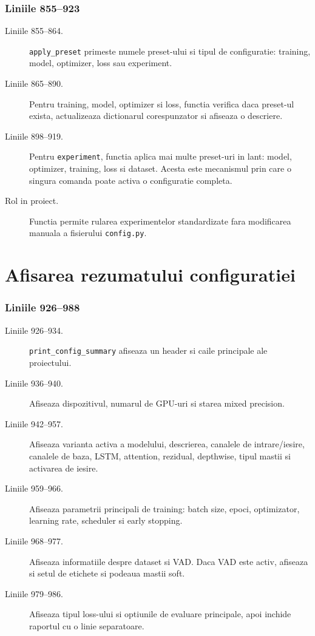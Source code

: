 \documentclass[12pt,a4paper]{report}
\newcommand{\codechunk}[2]{%
\subsection*{Liniile #1--#2}

}
\begin{document}
\codechunk{855}{923}

\begin{description}
    \item[Liniile 855--864.] \texttt{apply\_preset} primeste numele preset-ului si
    tipul de configuratie: training, model, optimizer, loss sau experiment.

    \item[Liniile 865--890.] Pentru training, model, optimizer si loss, functia
    verifica daca preset-ul exista, actualizeaza dictionarul corespunzator si
    afiseaza o descriere.

    \item[Liniile 898--919.] Pentru \texttt{experiment}, functia aplica mai multe
    preset-uri in lant: model, optimizer, training, loss si dataset. Acesta este
    mecanismul prin care o singura comanda poate activa o configuratie completa.

    \item[Rol in proiect.] Functia permite rularea experimentelor standardizate
    fara modificarea manuala a fisierului \texttt{config.py}.
\end{description}

\chapter{Afisarea rezumatului configuratiei}

\codechunk{926}{988}

\begin{description}
    \item[Liniile 926--934.] \texttt{print\_config\_summary} afiseaza un header si
    caile principale ale proiectului.

    \item[Liniile 936--940.] Afiseaza dispozitivul, numarul de GPU-uri si starea
    mixed precision.

    \item[Liniile 942--957.] Afiseaza varianta activa a modelului, descrierea,
    canalele de intrare/iesire, canalele de baza, LSTM, attention, rezidual,
    depthwise, tipul mastii si activarea de iesire.

    \item[Liniile 959--966.] Afiseaza parametrii principali de training: batch size,
    epoci, optimizator, learning rate, scheduler si early stopping.

    \item[Liniile 968--977.] Afiseaza informatiile despre dataset si VAD. Daca VAD
    este activ, afiseaza si setul de etichete si podeaua mastii soft.

    \item[Liniile 979--986.] Afiseaza tipul loss-ului si optiunile de evaluare
    principale, apoi inchide raportul cu o linie separatoare.
\end{description}
\end{document}
